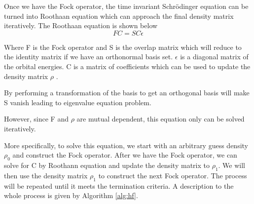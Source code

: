 \documentclass[twoside]{article}
\begin{document}
Once we have the Fock operator, the time invariant Schrödinger equation can be turned into Roothaan equation which can approach the final density matrix iteratively.
The Roothaan equation is shown below
\[
FC = SC\epsilon
\]



Where F is the Fock operator and S is the overlap matrix which will reduce to the identity matrix if we have an orthonormal basis set. $\epsilon$ is a diagonal matrix of the orbital energies. C is a matrix of coefficients which can be used to update the density matrix $\rho$ .

By performing a transformation of the basis to get an orthogonal basis will make S vanish leading to eigenvalue equation problem. 

However, since F and $\rho$ are mutual dependent, this equation only can be solved iteratively. 

More specifically, to solve this equation, we start with an arbitrary guess density $\rho_0$ and construct the Fock operator. After we have the Fock operator, we can solve for C by Roothann equation and update the density matrix to $\rho_1$. We will then use the density matrix $\rho_1$ to construct the next Fock operator. The process will be repeated until it meets the termination criteria. A description to the whole process is given by Algorithm \ref{alg:hf}.



\end{document}
